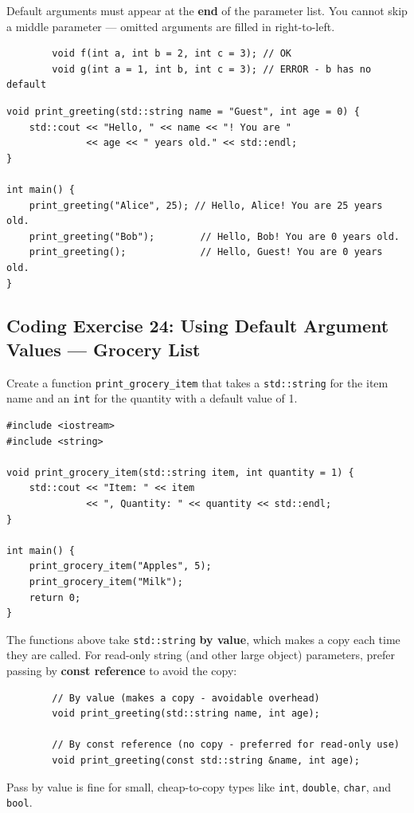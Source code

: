 \begin{remark}
	Default arguments must appear at the \textbf{end} of the parameter list. You cannot skip a middle parameter — omitted arguments are filled in right-to-left.
	\begin{lstlisting}
		void f(int a, int b = 2, int c = 3); // OK
		void g(int a = 1, int b, int c = 3); // ERROR - b has no default
	\end{lstlisting}
\end{remark}

\begin{lstlisting}
void print_greeting(std::string name = "Guest", int age = 0) {
	std::cout << "Hello, " << name << "! You are "
	          << age << " years old." << std::endl;
}

int main() {
	print_greeting("Alice", 25); // Hello, Alice! You are 25 years old.
	print_greeting("Bob");        // Hello, Bob! You are 0 years old.
	print_greeting();             // Hello, Guest! You are 0 years old.
}
\end{lstlisting}

\subsection{Coding Exercise 24: Using Default Argument Values --- Grocery List}
Create a function \texttt{print\_grocery\_item} that takes a \texttt{std::string} for the item name and an \texttt{int} for the quantity with a default value of 1.
\begin{lstlisting}
#include <iostream>
#include <string>

void print_grocery_item(std::string item, int quantity = 1) {
	std::cout << "Item: " << item
	          << ", Quantity: " << quantity << std::endl;
}

int main() {
	print_grocery_item("Apples", 5);
	print_grocery_item("Milk");
	return 0;
}
\end{lstlisting}

\begin{remark}
	The functions above take \texttt{std::string} \textbf{by value}, which makes a copy each time they are called. For read-only string (and other large object) parameters, prefer passing by \textbf{const reference} to avoid the copy:
	\begin{lstlisting}
		// By value (makes a copy - avoidable overhead)
		void print_greeting(std::string name, int age);

		// By const reference (no copy - preferred for read-only use)
		void print_greeting(const std::string &name, int age);
	\end{lstlisting}
	Pass by value is fine for small, cheap-to-copy types like \texttt{int}, \texttt{double}, \texttt{char}, and \texttt{bool}.
\end{remark}

